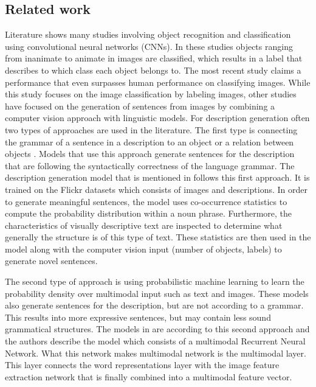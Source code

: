 \subsection{Related work}
Literature shows many studies involving object recognition and classification \cite{carbonetto2004statistical, he2015delving} using convolutional neural networks (CNNs). In these studies objects ranging from inanimate to animate in images are classified, which results in a label that describes to which class each object belongs to. The most recent study \cite{he2015delving} claims a performance that even surpasses human performance on classifying images. 
While this study focuses on the image classification by labeling images, other studies \cite{mao2014explain, mitchell2012midge, Yang2011, Farhadi2010} have focused on the generation of sentences from images by combining a computer vision approach with linguistic models. For description generation often two types of approaches are used in the literature. The first type is connecting the grammar of a sentence in a description to an object or a relation between objects \cite{karpathyjoulin2014deep}. Models that use this approach generate sentences for the description that are following the syntactically correctness of the language grammar. The description generation model that is mentioned in \cite{mitchell2012midge} follows this first approach. It is trained on the Flickr datasets which consists of images and descriptions. In order to generate meaningful sentences, the model uses co-occurrence statistics to compute the probability distribution within a noun phrase. Furthermore, the characteristics of visually descriptive text are inspected to determine what generally the structure is of this type of text. These statistics are then used in the model along with the computer vision input (number of objects, labels) to generate novel sentences.

The second type of approach is using probabilistic machine learning to learn the probability density over multimodal input such as text and images. These models also generate sentences for the description, but are not according to a grammar. This results into more expressive sentences, but may contain less sound grammatical structures. The models in \cite{mao2014explain,karpathyfeifei2014deep,karpathyjoulin2014deep} are according to this second approach and the authors describe the model which consists of a multimodal Recurrent Neural Network. What this network makes multimodal network is the multimodal layer. This layer connects the word representations layer with the image feature extraction network that is finally combined into a multimodal feature vector. 

